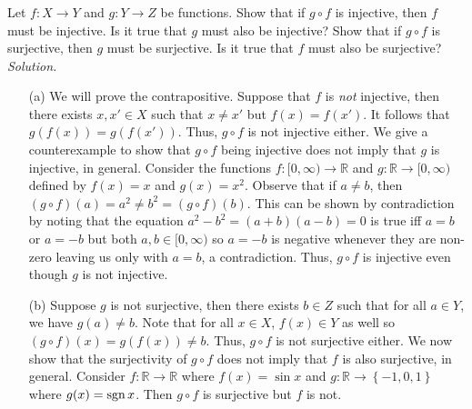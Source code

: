 \documentclass{amsart}
\theoremstyle{definition}
\newcommand{\R}{\mathbb{R}}
\newcommand{\soln}{\newline\textit{Solution.} }
\newcommand{\set}[1]{\left\{#1\right\}}
\begin{document}
\subsubsection{} Let $f:X\to Y$ and $g:Y\to Z$ be functions. Show that if $g\circ f$ is injective, then $f$ must be injective. Is it true that $g$ must also be injective? Show that if $g\circ f$ is surjective, then $g$ must be surjective. Is it true that $f$ must also be surjective? \\
\soln 
\begin{enumerate}
\item[(a)] We will prove the contrapositive. Suppose that $f$ is \textit{not} injective, then there exists $x,x'\in X$ such that $x\neq x'$ but $f(x)=f(x')$. It follows that $g(f(x))=g(f(x'))$. Thus, $g\circ f$ is not injective either. We give a counterexample to show that $g\circ f$ being injective does not imply that $g$ is injective, in general. Consider the functions $f:[0,\infty)\to\R$ and $g:\R\to [0,\infty)$ defined by $f(x)=x$ and $g(x)=x^2$. Observe that if $a\neq b$, then $(g\circ f)(a)=a^2\neq b^2=(g\circ f)(b)$. This can be shown by contradiction by noting that the equation $a^2-b^2=(a+b)(a-b)=0$ is true iff $a=b$ or $a=-b$ but both $a,b\in [0,\infty)$ so $a=-b$ is negative whenever they are non-zero leaving us only with $a=b$, a contradiction. Thus, $g\circ f$ is injective even though $g$ is not injective. \\
\item[(b)] Suppose $g$ is not surjective, then there exists $b\in Z$ such that for all $a\in Y$, we have $g(a)\neq b$. Note that for all $x\in X$, $f(x)\in Y$ as well so $(g\circ f)(x)=g(f(x))\neq b$. Thus, $g\circ f$ is not surjective either. We now show that the surjectivity of $g\circ f$ does not imply that $f$ is also surjective, in general. Consider $f:\R\to\R$ where $f(x)=\sin x$ and $g:\R\to\set{-1,0,1}$ where $g(x)=\mathop{\rm sgn}x$. Then $g\circ f$ is surjective but $f$ is not. \\
\end{enumerate}
\end{document}
